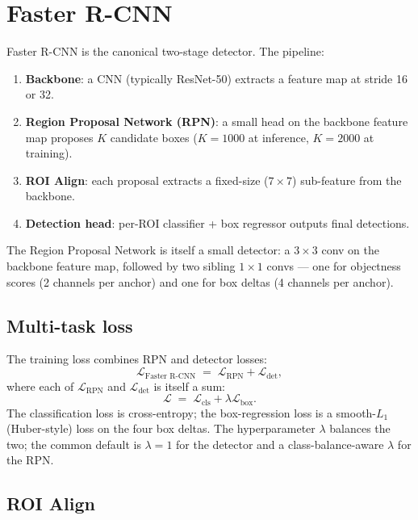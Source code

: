 \section{Faster R-CNN}
\label{sec:detection_segmentation:faster_rcnn}

Faster R-CNN \cite{ren_faster_rcnn_2015} is the canonical
two-stage detector. The pipeline:

\begin{enumerate}
  \item \textbf{Backbone}: a CNN (typically ResNet-50) extracts
    a feature map at stride 16 or 32.
  \item \textbf{Region Proposal Network (RPN)}: a small head on
    the backbone feature map proposes $K$ candidate boxes
    ($K = 1000$ at inference, $K = 2000$ at training).
  \item \textbf{ROI Align}: each proposal extracts a fixed-size
    ($7 \times 7$) sub-feature from the backbone.
  \item \textbf{Detection head}: per-ROI classifier + box
    regressor outputs final detections.
\end{enumerate}

The Region Proposal Network is itself a small detector: a
$3 \times 3$ conv on the backbone feature map, followed by two
sibling $1 \times 1$ convs --- one for objectness scores (2
channels per anchor) and one for box deltas (4 channels per
anchor).

\subsection{Multi-task loss}
\label{ssec:detection_segmentation:faster_rcnn_loss}

The training loss combines RPN and detector losses:
\[
  \mathcal{L}_{\text{Faster R-CNN}} \;=\;
  \mathcal{L}_{\text{RPN}} + \mathcal{L}_{\text{det}},
\]
where each of $\mathcal{L}_{\text{RPN}}$ and
$\mathcal{L}_{\text{det}}$ is itself a sum:
\[
  \mathcal{L} \;=\; \mathcal{L}_{\text{cls}} + \lambda \mathcal{L}_{\text{box}}.
\]
The classification loss is cross-entropy; the box-regression
loss is a smooth-$L_1$ (Huber-style) loss on the four box
deltas. The hyperparameter $\lambda$ balances the two; the
common default is $\lambda = 1$ for the detector and a
class-balance-aware $\lambda$ for the RPN.

\subsection{ROI Align}
\label{ssec:detection_segmentation:roi_align}

